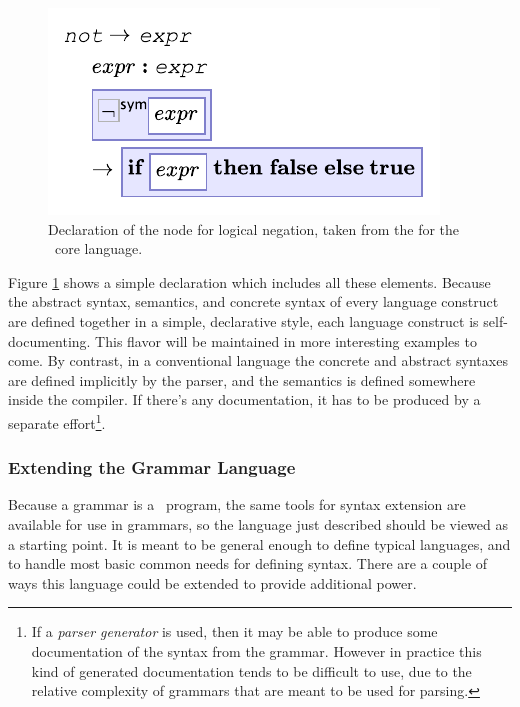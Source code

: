 \begin{figure}[ht]


  \includegraphics{src/image/not.pdf}

  \caption{\label{fig-and} Declaration of the  node for logical negation, taken from the  for the \Meta\ core language.}
\end{figure}

Figure \ref{fig-and} shows a simple declaration which includes all these elements. Because  the abstract syntax, semantics, and concrete syntax of every language construct are defined together in a simple, declarative style, each language construct is self-documenting. This flavor will be maintained in more interesting examples to come. By contrast, in a conventional language the concrete and abstract syntaxes are defined implicitly by the parser, and the semantics is defined somewhere inside the compiler. If there's any documentation, it has to be produced by a separate effort\footnote{If a \emph{parser generator} is used, then it may be able to produce some documentation of the syntax from the grammar. However in practice this kind of generated documentation tends to be difficult to use, due to the relative complexity of grammars that are meant to be used for parsing.}.


\subsubsection{Extending the Grammar Language}
Because a grammar is a \Meta\ program, the same tools for syntax extension are available for use in grammars, so the  language just described should be viewed as a starting point. It is meant to be general enough to define typical languages, and to handle most basic common needs for defining syntax. There are a couple of ways this language could be extended to provide additional power.

